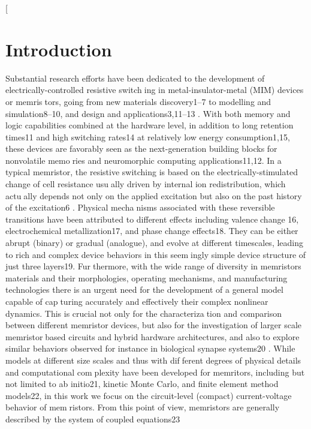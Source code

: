 \documentclass{article}
\begin{document}
\begin{multicols}{2}
[
\section{Introduction}
Substantial research efforts have been dedicated to the
development of electrically-controlled resistive switching in metal-insulator-metal (MIM) devices or memristors, going from new materials discovery1–7
to modelling
and simulation8–10, and design and applications3,11–13
.
With both memory and logic capabilities combined at
the hardware level, in addition to long retention times11
and high switching rates14 at relatively low energy
consumption1,15, these devices are favorably seen as the
next-generation building blocks for nonvolatile memories and neuromorphic computing applications11,12. In
a typical memristor, the resistive switching is based on
the electrically-stimulated change of cell resistance usually driven by internal ion redistribution, which actually depends not only on the applied excitation but also
on the past history of the excitation6
. Physical mechanisms associated with these reversible transitions have
been attributed to different effects including valencechange 16, electrochemical metallization17, and phase
change effects18. They can be either abrupt (binary)
or gradual (analogue), and evolve at different timescales,
leading to rich and complex device behaviors in this seemingly simple device structure of just three layers19. Furthermore, with the wide range of diversity in memristors
materials and their morphologies, operating mechanisms,
and manufacturing technologies there is an urgent need
for the development of a general model capable of capturing accurately and effectively their complex nonlinear
dynamics. This is crucial not only for the characterization and comparison between different memristor devices,
but also for the investigation of larger scale memristorbased circuits and hybrid hardware architectures, and
also to explore similar behaviors observed for instance in
biological synapse systems20
.
While models at different size scales and thus with different degrees of physical details and computational complexity have been developed for memritors, including but not limited to ab initio21, kinetic Monte Carlo, and finite
element method models22, in this work we focus on the
circuit-level (compact) current-voltage behavior of memristors. From this point of view, memristors are generally
described by the system of coupled equations23
\begin{eqnarray}

\end{eqnarray}
\end{multicols}
\end{document}
